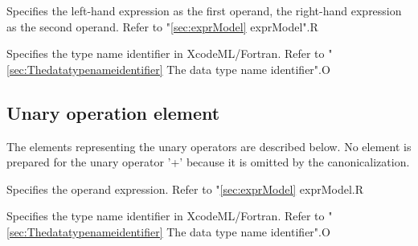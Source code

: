 
\begin{XcodeMLChildElements}
{Specifies the left-hand expression as the first operand, the right-hand expression as the second operand. Refer to "\ref{sec:exprModel} exprModel".}{R}
\end{XcodeMLChildElements}

\begin{XcodeMLAttributes}
{Specifies the type name identifier in XcodeML/Fortran.
 Refer to "\ref{sec:Thedatatypenameidentifier} The data type name identifier".}{O}
\end{XcodeMLAttributes}


\subsection{Unary operation element}

The elements representing the unary operators are described below.
No element is prepared for the unary operator '+' because it is omitted by the canonicalization.
\newline

\begin{XcodeMLOperations}
\end{XcodeMLOperations}


\begin{XcodeMLChildElements}
{Specifies the operand expression. Refer to "\ref{sec:exprModel} exprModel.}{R}
\end{XcodeMLChildElements}

\begin{XcodeMLAttributes}
{Specifies the type name identifier in XcodeML/Fortran.
 Refer to "\ref{sec:Thedatatypenameidentifier} The data type name identifier".}{O}
\end{XcodeMLAttributes}


